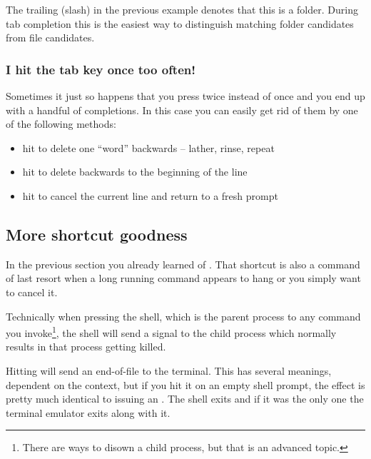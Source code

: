 \documentclass{olli-handout}
\begin{document}

{\olliHandLeft} The trailing \TT{/} (slash) in the previous example denotes that this is a folder. During tab completion this is the easiest way to distinguish matching folder candidates from file candidates.

\subsubsection{I hit the tab key once too often!}

Sometimes it just so happens that you press \keys{\tab} twice instead of once and you end up with a handful of completions. In this case you can easily get rid of them by one of the following methods:

\begin{itemize}
	\item hit  to delete one ``word'' backwards -- lather, rinse, repeat
	\item hit  to delete backwards to the beginning of the line
	\item hit  to cancel the current line and return to a fresh prompt
\end{itemize}

\subsection{More shortcut goodness}

In the previous section you already learned of . That shortcut is also a command of last resort when a long running command appears to hang or you simply want to cancel it.

Technically when pressing  the shell, which is the parent process to any command you invoke\footnote{There are ways to disown a child process, but that is an advanced topic.}, the shell will send a signal to the child process which normally results in that process getting killed.

Hitting  will send an end-of-file to the terminal. This has several meanings, dependent on the context, but if you hit it on an empty shell prompt, the effect is pretty much identical to issuing an . The shell exits and if it was the only one the terminal emulator exits along with it.
\end{document}
